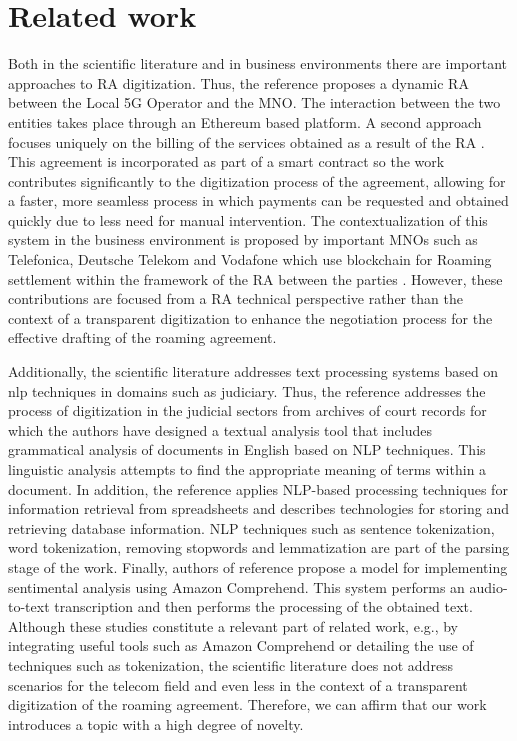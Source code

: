 \documentclass[conference]{style/IEEEtran}
\begin{document}
\section{Related work}

Both in the scientific literature and in business environments there are important approaches to RA digitization. Thus, the reference \cite{9369516} proposes a dynamic RA between the Local 5G Operator and the MNO. The interaction between the two entities takes place through an Ethereum based platform. A second approach focuses uniquely on the billing of the services obtained as a result of the RA \cite{9024541}. This agreement is incorporated as part of a smart contract so the work contributes significantly to the digitization process of the agreement, allowing for a faster, more seamless process in which payments can be requested and obtained quickly due to less need for manual intervention. The contextualization of this system in the business environment is proposed by important MNOs such as Telefonica, Deutsche Telekom and Vodafone which use blockchain for Roaming settlement within the framework of the RA between the parties \cite{Huillet2020}. However, these contributions are focused from a RA technical perspective rather than the context of a transparent digitization to enhance the negotiation process for the effective drafting of the roaming agreement. 

Additionally, the scientific literature addresses text processing systems based on nlp techniques in domains such as judiciary. Thus, the reference \cite{8487847} addresses the process of digitization in the judicial sectors from archives of court records for which the authors have designed a textual analysis tool that includes grammatical analysis of documents in English based on NLP techniques. This linguistic analysis attempts to find the appropriate meaning of terms within a document. In addition, the reference \cite{9138070} applies NLP-based processing techniques for information retrieval from spreadsheets and describes technologies for storing and retrieving database information. NLP techniques such as sentence tokenization, word tokenization, removing stopwords and lemmatization are part of the parsing stage of the work. Finally, authors of reference \cite{9104105} propose a model for implementing sentimental analysis using Amazon Comprehend. This system performs an audio-to-text transcription and then performs the processing of the obtained text. Although these studies  constitute a relevant part of related work, e.g., by integrating useful tools such as Amazon Comprehend or detailing the use of techniques such as tokenization, the scientific literature does not address scenarios for the telecom field and even less in the context of a transparent digitization of the roaming agreement. Therefore, we can affirm that our work introduces a topic with a high degree of novelty.
\end{document}
